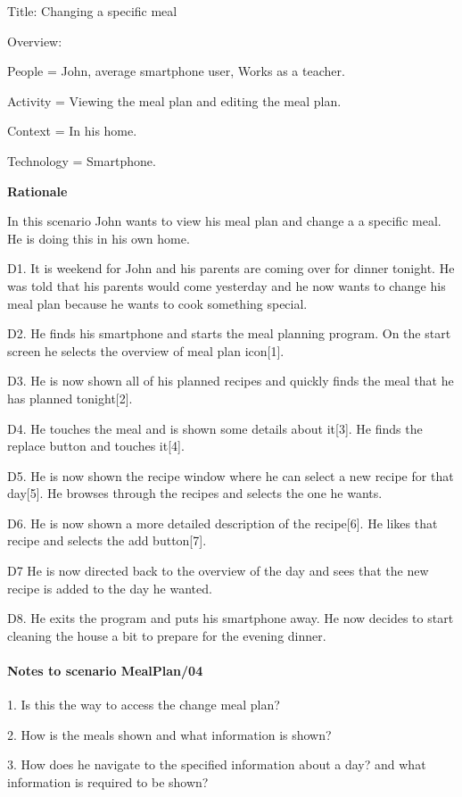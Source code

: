 Title: Changing a specific meal

Overview:
	
	People = John, average smartphone user, Works as a teacher.
	
	Activity = Viewing the meal plan and editing the meal plan.
	
	Context = In his home. 
	
	Technology = Smartphone.
	
\textbf{Rationale}

In this scenario John wants to view his meal plan and change a a specific meal. He is doing this in his own home.

	D1. It is weekend for John and his parents are coming over for dinner tonight. He was told that his parents would come yesterday and he now wants to change his meal plan because he wants to cook something special.
	
	D2. He finds his smartphone and starts the meal planning program. On the start screen he selects the overview of meal plan icon[1].
	
	D3. He is now shown all of his planned recipes and quickly finds the meal that he has planned tonight[2].
	
	D4. He touches the meal and is shown some details about it[3]. He finds the replace button and touches it[4].
	
	D5. He is now shown the recipe window where he can select a new recipe for that day[5]. He browses through the recipes and selects the one he wants. 
	
	D6. He is now shown a more detailed description of the recipe[6]. He likes that recipe and selects the add button[7].
	
	D7 He is now directed back to the overview of the day and sees that the new recipe is added to the day he wanted.
	
	D8. He exits the program and puts his smartphone away. He now decides to start cleaning the house a bit to prepare for the evening dinner.
	
\paragraph{Notes to scenario MealPlan/04}

1. Is this the way to access the change meal plan?

2. How is the meals shown and what information is shown? 

3. How does he navigate to the specified information about a day? and what information is required to be shown?

